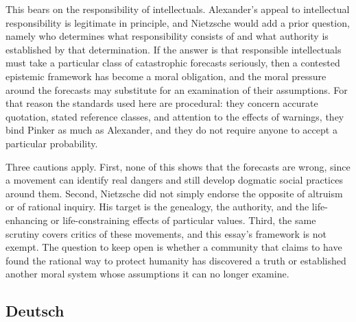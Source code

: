 \documentclass[11pt]{article}
\begin{document}
This bears on the responsibility of intellectuals. Alexander's appeal to intellectual responsibility is legitimate in principle, and Nietzsche would add a prior question, namely who determines what responsibility consists of and what authority is established by that determination. If the answer is that responsible intellectuals must take a particular class of catastrophic forecasts seriously, then a contested epistemic framework has become a moral obligation, and the moral pressure around the forecasts may substitute for an examination of their assumptions. For that reason the standards used here are procedural: they concern accurate quotation, stated reference classes, and attention to the effects of warnings, they bind Pinker as much as Alexander, and they do not require anyone to accept a particular probability.

Three cautions apply. First, none of this shows that the forecasts are wrong, since a movement can identify real dangers and still develop dogmatic social practices around them. Second, Nietzsche did not simply endorse the opposite of altruism or of rational inquiry. His target is the genealogy, the authority, and the life-enhancing or life-constraining effects of particular values. Third, the same scrutiny covers critics of these movements, and this essay's framework is not exempt. The question to keep open is whether a community that claims to have found the rational way to protect humanity has discovered a truth or established another moral system whose assumptions it can no longer examine.

\subsection{Deutsch}
\end{document}
